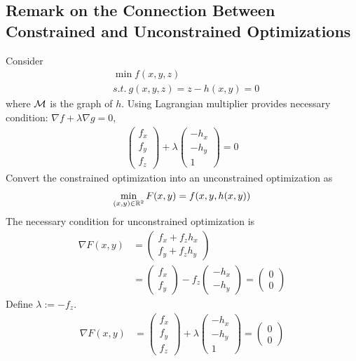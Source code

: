 \documentclass{article}
\begin{document}
   	\subsection{Remark on the Connection Between Constrained and Unconstrained Optimizations}
   	\begin{example}
   		Consider
   		\begin{align}
   			&\min f(x,y,z) \\
   			&s.t.\ g(x,y,z) = z - h(x,y) = 0
   		\end{align}
   		where $\mathcal{{M}}$ is the graph of $h$. Using Lagrangian multiplier provides necessary condition: $\nabla f + \lambda \nabla g = 0$,
   		\begin{align}
   			\begin{pmatrix}
   				f_x \\ f_y \\ f_z
   			\end{pmatrix}
   			+ \lambda
   			\begin{pmatrix}
   				-h_x \\ -h_y \\ 1
   			\end{pmatrix} = 0
   		\end{align}
   		Convert the constrained optimization into an unconstrained optimization as 
   		\begin{align}
   			\min_{(x,y) \in \mathbb{R}^2} F(x, y) = f(x, y, h(x, y))
   		\end{align}
   		The necessary condition for unconstrained optimization is
   		\begin{align}
   			\nabla F(x, y) &= \begin{pmatrix}
   				f_x + f_z h_x \\
   				f_y + f_z h_y
   			\end{pmatrix} \\
   			&= \begin{pmatrix}
   				f_x \\ f_y
   			\end{pmatrix} - f_z \begin{pmatrix}
   				-h_x \\ -h_y
   			\end{pmatrix} = \begin{pmatrix}
   				0 \\ 0
   			\end{pmatrix}
   		\end{align}
   		Define $\lambda := -f_z$.
   		\begin{align}
   			\nabla F(x, y) &= \begin{pmatrix}
   				f_x \\ f_y \\ f_z
   			\end{pmatrix} + \lambda
   			\begin{pmatrix}
   				-h_x \\ -h_y \\ 1
   			\end{pmatrix} = \begin{pmatrix}
   				0 \\ 0
   			\end{pmatrix}
   		\end{align}
   	\end{example}
\end{document}
